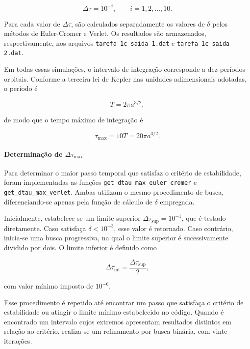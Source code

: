 \documentclass[12pt,a4paper]{article}
\begin{document}
\begin{equation}
    \Delta\tau=10^{-i},
    \qquad i=1,2,\ldots,10.
\end{equation}

Para cada valor de $\Delta\tau$, são calculados
separadamente os valores de $\delta$ pelos métodos
de Euler-Cromer e Verlet. Os resultados são armazenados,
respectivamente, nos arquivos
\texttt{tarefa-1c-saida-1.dat} e
\texttt{tarefa-1c-saida-2.dat}.

Em todas essas simulações, o intervalo de integração
corresponde a dez períodos orbitais. Conforme a
terceira lei de Kepler nas unidades adimensionais
adotadas, o período é

\begin{equation}
    T=2\pi a^{3/2},
\end{equation}

de modo que o tempo máximo de integração é

\begin{equation}
    \tau_{\max}=10T=20\pi a^{3/2}.
\end{equation}

\paragraph{Determinação de $\Delta\tau_{\max}$}

Para determinar o maior passo temporal que satisfaz
o critério de estabilidade, foram implementadas
as funções \texttt{get\_dtau\_max\_euler\_cromer}
e \texttt{get\_dtau\_max\_verlet}. Ambas utilizam
o mesmo procedimento de busca, diferenciando-se
apenas pela função de cálculo de $\delta$ empregada.

Inicialmente, estabelece-se um limite superior
$\Delta\tau_{\mathrm{sup}}=10^{-1}$, que é testado
diretamente. Caso satisfaça $\delta<10^{-3}$,
esse valor é retornado. Caso contrário, inicia-se
uma busca progressiva, na qual o limite superior
é sucessivamente dividido por dois. O limite
inferior é definido como

\begin{equation}
    \Delta\tau_{\mathrm{inf}}
    =\frac{\Delta\tau_{\mathrm{sup}}}{2},
\end{equation}

com valor mínimo imposto de $10^{-6}$.

Esse procedimento é repetido até encontrar um passo
que satisfaça o critério de estabilidade ou atingir
o limite mínimo estabelecido no código. Quando
é encontrado um intervalo cujos extremos apresentam
resultados distintos em relação ao critério, realiza-se
um refinamento por busca binária, com vinte iterações.
\end{document}
